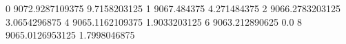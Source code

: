0 9072.9287109375 9.7158203125
1 9067.484375 4.271484375
2 9066.2783203125 3.0654296875
4 9065.1162109375 1.9033203125
6 9063.212890625 0.0
8 9065.0126953125 1.7998046875
